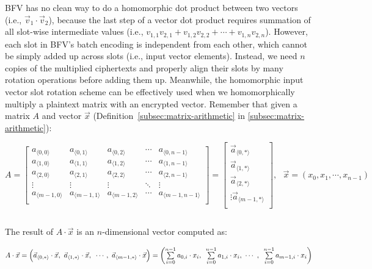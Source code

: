 BFV has no clean way to do a homomorphic dot product between two vectors (i.e., $\vec{v}_1 \cdot \vec{v}_2$), because the last step of a vector dot product requires summation of all slot-wise intermediate values (i.e., $v_{1,1}v_{2,1} + v_{1,2}v_{2,2} + \cdots + v_{1,n}v_{2,n}$). However, each slot in BFV's batch encoding is independent from each other, which cannot be simply added up across slots (i.e., input vector elements). Instead, we need $n$ copies of the multiplied ciphertexts and properly align their slots by many rotation operations before adding them up. Meanwhile, the homomorphic input vector slot rotation scheme can be effectively used when we homomorphically multiply a plaintext matrix with an encrypted vector. Remember that given a matrix $A$ and vector $\vec{x}$ (Definition~\ref*{subsec:matrix-arithmetic} in \autoref{subsec:matrix-arithmetic}):

$A = \begin{bmatrix}
 a_{\langle 0, 0\rangle} & a_{\langle 0, 1\rangle} & a_{\langle 0, 2\rangle} & \cdots & a_{\langle 0, n-1\rangle}\\
 a_{\langle 1, 0\rangle} & a_{\langle 1, 1\rangle} & a_{\langle 1, 2\rangle} & \cdots & a_{\langle 1, n-1\rangle} \\
 a_{\langle 2, 0\rangle} & a_{\langle 2, 1\rangle} & a_{\langle 2, 2\rangle} & \cdots & a_{\langle 2, n-1\rangle} \\
\vdots & \vdots & \vdots & \ddots & \vdots \\
 a_{\langle m-1, 0\rangle} & a_{\langle m-1, 1\rangle} & a_{\langle m-1, 2\rangle} & \cdots & a_{\langle m-1, n-1\rangle} \\
\end{bmatrix} = \begin{bmatrix} 
\vec{a}_{\langle 0, * \rangle} \\ 
\vec{a}_{\langle 1, * \rangle} \\ 
\vec{a}_{\langle 2, * \rangle} \\ 
\vdots
\vec{a}_{\langle m-1, * \rangle} \\ 
\end{bmatrix}, \text{ } \vec{x} = (x_0, x_1, \cdots, x_{n-1})$

$ $

The result of $A \cdot \vec{x}$ is an $n$-dimensional vector computed as:

$A \cdot \vec{x} = \Big(\vec{a}_{\langle 0, * \rangle} \cdot \vec{x}, \text{ } \vec{a}_{\langle 1, * \rangle} \cdot \vec{x}, \text{ }\cdots,\text{ } \vec{a}_{\langle m-1, * \rangle} \cdot \vec{x} \Big) = \left(\sum\limits_{i=0}^{n-1} a_{0, i} \cdot  x_i, \text{ } \sum\limits_{i=0}^{n-1}  a_{1, i} \cdot x_i, \text{ } \text{$\cdots$} \text{ }, \text{ } \sum\limits_{i=0}^{n-1} a_{m-1, i} \cdot x_i \right)$

